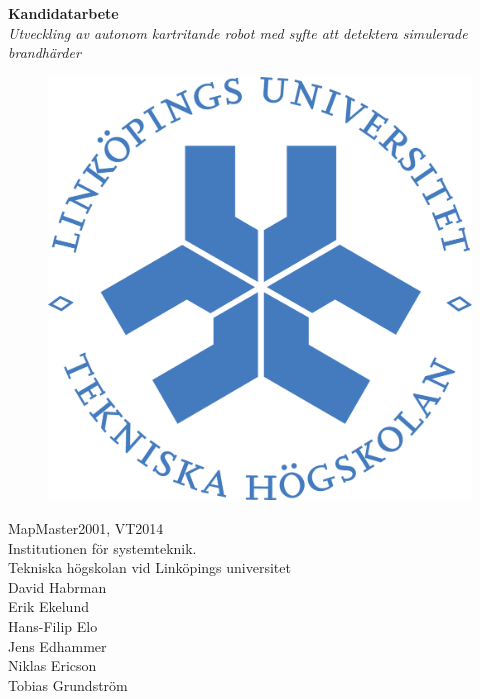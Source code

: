 \documentclass[a4paper,12pt,fleqn]{article}
\begin{document}
	\pagestyle{fancy}
	\thispagestyle{empty}
	\vspace*{\fill}
		\begingroup
			\begin{center}
				\huge{\textbf{Kandidatarbete}} 
				\\
				\vspace{15pt}
				\large{\emph{Utveckling av autonom kartritande robot med syfte att detektera simulerade brandhärder}}
				\normalsize
				\\
				\vspace{55pt}
				\begin{figure}[htp]
					\begin{center}
				  	  \includegraphics[keepaspectratio=true,scale=1.2]{linkoping.png}  %
					\end{center}
				\end{figure}
				\vspace{40pt}
				MapMaster2001, VT2014
				\\
				Institutionen för systemteknik.
				\\
				Tekniska högskolan vid Linköpings universitet
				\\
				\vspace{20 pt}
				David Habrman \\
				Erik Ekelund \\
				Hans-Filip Elo \\
				Jens Edhammer \\
				Niklas Ericson \\
				Tobias Grundström \\
			\end{center}
		\endgroup
	\vspace*{\fill}
\end{document}
